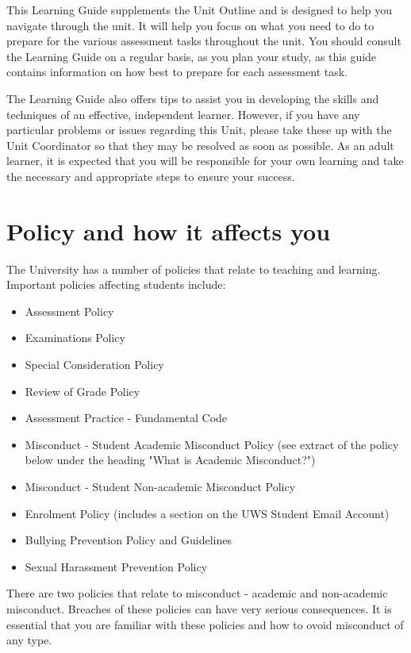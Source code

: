 \documentclass[a4paper,oneside]{book}
\begin{document}
This Learning Guide supplements the Unit Outline and is designed to
help you navigate through the unit.  It will help you focus on what
you need to do to prepare for the various assessment tasks throughout
the unit.  You should consult the Learning Guide on a regular basis,
as you plan your study, as this guide contains information on how best
to prepare for each assessment task.

The Learning Guide also offers tips to assist you in developing the
skills and techniques of an effective, independent learner.  However,
if you have any particular problems or issues regarding this Unit,
please take these up with the Unit Coordinator so that they may be
resolved as soon as possible.  As an adult learner, it is expected
that you will be responsible for your own learning and take the
necessary and appropriate steps to ensure your success.

\section{Policy and how it affects you}

The University has a number of policies that relate to teaching and
learning.  Important policies affecting students include:
\begin{itemize}
\item Assessment Policy
\item Examinations Policy
\item Special Consideration Policy
\item Review of Grade Policy
\item Assessment Practice - Fundamental Code
\item Misconduct - Student Academic Misconduct Policy (see extract of
  the policy below under the heading "What is Academic Misconduct?")
\item Misconduct - Student Non-academic Misconduct Policy
\item Enrolment Policy (includes a section on the UWS Student Email Account)
\item Bullying Prevention Policy and Guidelines
\item Sexual Harassment Prevention Policy
\end{itemize}
There are two policies that relate to misconduct - academic and
non-academic misconduct.  Breaches of these policies can have very
serious consequences.  It is essential that you are familiar with
these policies and how to ovoid misconduct of any type.
\end{document}
